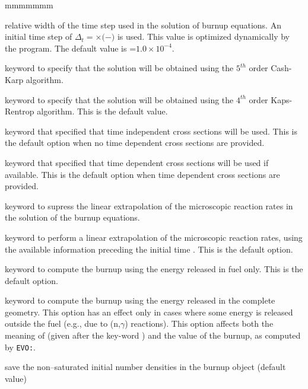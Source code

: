 \begin{ListeDeDescription}{mmmmmmm}
\item[\dusa{valh1}] relative width of the time step used in the solution of
burnup equations. An initial time step of 
$\Delta_{t}=$$\times ($$-$$)$ 
is used. This value is optimized dynamically by the program. The
default value is =$1.0\times 10^{-4}$.

\item[\moc{RUNG}] keyword to specify that the solution will be obtained using
the $5^{th}$ order Cash-Karp algorithm.

\item[\moc{KAPS}] keyword to specify that the solution will be obtained using
the $4^{th}$ order Kaps-Rentrop algorithm. This is the default value.

\item[\moc{TIXS}] keyword that specified that time independent cross sections will be used.
This is the default option when no time dependent cross sections are provided.

\item[\moc{TDXS}] keyword that specified that time dependent cross sections will be used if available.
This is the default option when time dependent cross sections are provided.

\item[\moc{NOEX}] keyword to supress the linear extrapolation of the
microscopic reaction rates in
the solution of the burnup equations.

\item[\moc{EXTR}] keyword to perform a linear extrapolation of the microscopic reaction rates, using
the available information preceding the initial time . This is the
default option.

\item[\moc{NOGL}] keyword to compute the burnup using the energy released in
fuel only. This is the default option.

\item[\moc{GLOB}]  keyword to compute the burnup using the energy released in
the complete geometry. This option has an effect only in cases where some
energy is released outside the fuel (e.g., due to (n,$\gamma$) reactions).
This option affects both the meaning of  (given after the
key-word ) and the value of the burnup, as computed by {\tt EVO:}.

\item[\moc{NSAT}] save the non--saturated initial number densities in the {\sc burnup}
object  (default value)


\end{ListeDeDescription}
